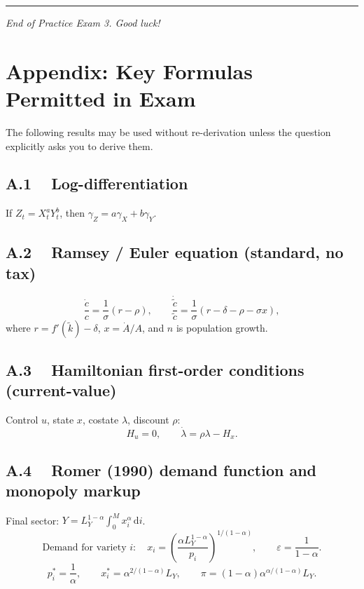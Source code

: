 \documentclass[a4paper,11pt]{article}
\newcommand{\ktilde}{\tilde{k}}
\newcommand{\ctilde}{\tilde{c}}
\newcommand{\dd}{\mathrm{d}}
\begin{document}
\vspace{20pt}
\noindent\rule{\textwidth}{0.4pt}

\begin{center}
    \textit{End of Practice Exam 3. Good luck!}
\end{center}

\clearpage
\appendix
\section*{Appendix: Key Formulas Permitted in Exam}

The following results may be used without re-derivation unless the question explicitly asks
you to derive them.

\subsection*{A.1 ~ Log-differentiation}
If $Z_t = X_t^a Y_t^b$, then $\gamma_Z = a\gamma_X + b\gamma_Y$.

\subsection*{A.2 ~ Ramsey / Euler equation (standard, no tax)}
\[
    \frac{\dot{c}}{c} = \frac{1}{\sigma}(r - \rho),
    \qquad
    \frac{\dot{\ctilde}}{\ctilde} = \frac{1}{\sigma}(r - \delta - \rho - \sigma x),
\]
where $r = f'(\ktilde) - \delta$, $x = \dot{A}/A$, and $n$ is population growth.

\subsection*{A.3 ~ Hamiltonian first-order conditions (current-value)}
Control $u$, state $x$, costate $\lambda$, discount $\rho$:
\[
    H_u = 0, \qquad \dot{\lambda} = \rho\lambda - H_x.
\]

\subsection*{A.4 ~ Romer (1990) demand function and monopoly markup}
Final sector: $Y = L_Y^{1-\alpha}\int_0^M x_i^\alpha\,\dd i$.
\[
    \text{Demand for variety } i{:}\quad x_i = \left(\frac{\alpha L_Y^{1-\alpha}}{p_i}\right)^{1/(1-\alpha)}, \qquad
    \varepsilon = \frac{1}{1-\alpha}.
\]
\[
    p_i^* = \frac{1}{\alpha}, \qquad
    x_i^* = \alpha^{2/(1-\alpha)}L_Y, \qquad
    \pi = (1-\alpha)\alpha^{\alpha/(1-\alpha)}L_Y.
\]
\end{document}
